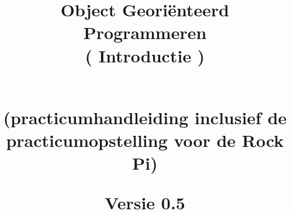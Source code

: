 \documentclass[x11names,12pt,openright,twoside]{report}
\date{}
\title{
	
	{\vspace{-4cm}}
	
	{\hspace{-20pt}\begin{bfseries}\LARGE{\color{black}Object Georiënteerd Programmeren  \\( Introductie )} \end{bfseries}  } \\
	\small{(practicumhandleiding inclusief de practicumopstelling voor de Rock Pi)}
	\ThisCenterWallPaper{0.8}{figuren/frontRock.jpg}
	
	{Versie 0.5}
	
	{\vspace{12cm}}	
	{\color{white}  
		\raggedleft  \par}
	
}
\begin{document}
	
	
	\maketitle
	
	\tableofcontents
	
	\let\cleardoublepage\clearpage
	
	
%	
	
	
	\begin{comment}
	\maketitle
	
	
	\tableofcontents
	
	\let\cleardoublepage\clearpage
	\let\cleardoublepage\clearpage
	
	
%	
	\let\cleardoublepage\relax
%	

	
	
	
	
	
	\end{comment}
\end{document}
